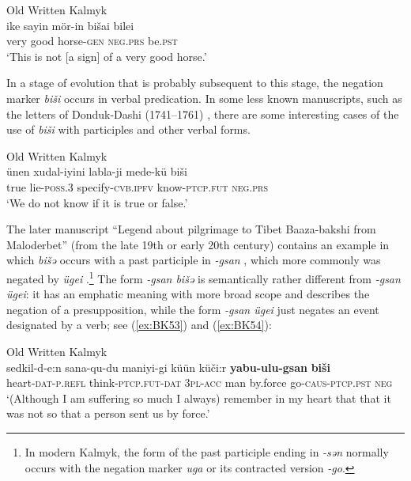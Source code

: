 \documentclass[output=paper,draft,draftmode,colorlinks,citecolor=brown]{langscibook}
\begin{document}
\ea Old Written Kalmyk \citep[27, Letter 9, lines 7–8]{krueger2002a} \label{ex:BK51}\\
	\gll ike		sayin		mör-in		bišai		bilei\\
	very	good		horse-\textsc{gen}	\textsc{neg.prs}	be.\textsc{pst}\\
	\glt `This is not [a sign] of a very good horse.'
\z

In a stage of evolution that is probably subsequent to this stage, the negation marker \textit{biši} occurs in verbal predication. In some less known manuscripts, such as the letters of Donduk-Dashi (1741–1761) \citep{kokshaeva2011a}, there are some interesting cases of the use of \textit{biši} with participles and other verbal forms.

\newpage
\ea Old Written Kalmyk \citep[167]{kokshaeva2011a} \label{ex:BK52}\\
	\gll ünen	xudal-iyini	labla-ji			mede-kü			biši\\
	true	lie-\textsc{poss.3}	specify-\textsc{cvb.ipfv}	know-\textsc{ptcp.fut}	\textsc{neg.prs}\\
	\glt `We do not know if it is true or false.'
\z


The later manuscript “Legend about pilgrimage to Tibet Baaza-bakshi from Maloderbet” (from the late 19th or early 20th century) contains an example in which \textit{bišǝ} occurs with a past participle in \textit{-gsan} , which more commonly was negated by \textit{ügei} .\footnote{In modern Kalmyk, the form of the past participle ending in \textit{-sən} normally occurs with the negation marker \textit{uga} or its contracted version \textit{-go}.} The form \textit{-gsan bišǝ} is semantically rather different from \textit{-gsan ügei}: it has an emphatic meaning with more broad scope and describes the negation of a presupposition, while the form \textit{-gsan ügei} just negates an event designated by a verb; see (\ref{ex:BK53}) and (\ref{ex:BK54}):

\ea Old Written Kalmyk \citep[103]{bembeev2004a} \label{ex:BK53}\\
	\gll sedkil-d-e:n		sana-qu-du		maniyi-gi	küün	küči:r	\textbf{yabu-ulu-gsan}	\textbf{biši}\\
	heart-\textsc{dat-p.refl}	think-\textsc{ptcp.fut-dat}	\textsc{3pl-acc} 	man	by.force	go-\textsc{caus-ptcp.pst}	\textsc{neg}\\
	\glt `(Although I am suffering so much I always) remember in my heart that that it was not so that a person sent us by force.'
\z
\end{document}
